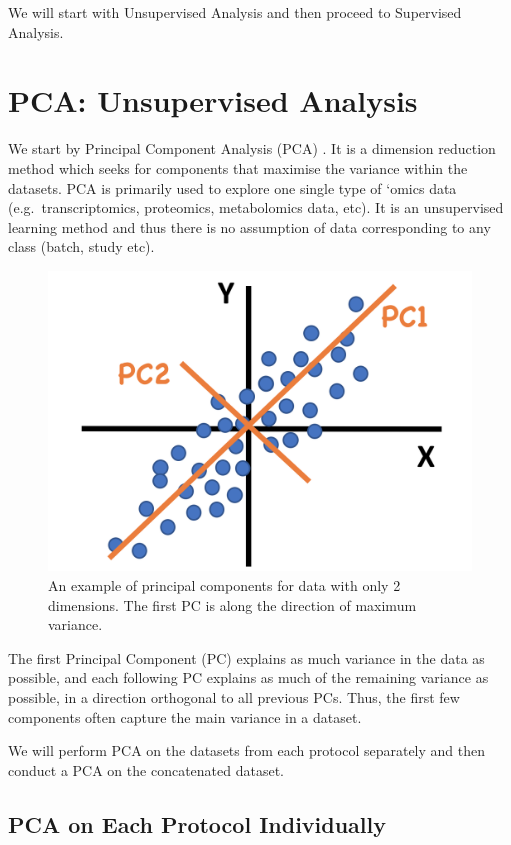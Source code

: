 \documentclass[]{book}
\theoremstyle{definition}
\theoremstyle{definition}
\theoremstyle{definition}
\theoremstyle{remark}
\begin{document}
We will start with Unsupervised Analysis and then proceed to Supervised
Analysis.

\hypertarget{pca-unsupervised-analysis}{%
\section{PCA: Unsupervised Analysis}\label{pca-unsupervised-analysis}}

We start by Principal Component Analysis (PCA) \citep{pca}. It is a
dimension reduction method which seeks for components that maximise the
variance within the datasets. PCA is primarily used to explore one
single type of `omics data (e.g.~transcriptomics, proteomics,
metabolomics data, etc). It is an unsupervised learning method and thus
there is no assumption of data corresponding to any class (batch, study
etc).

\begin{figure}[ht]

{\centering \includegraphics[width=0.4\linewidth]{figures/pca} 

}

\caption{An example of principal components for data with only 2 dimensions. The first PC is along the direction of maximum variance.}\label{fig:1-pcaExample}
\end{figure}

The first Principal Component (PC) explains as much variance in the data
as possible, and each following PC explains as much of the remaining
variance as possible, in a direction orthogonal to all previous PCs.
Thus, the first few components often capture the main variance in a
dataset.

We will perform PCA on the datasets from each protocol separately and
then conduct a PCA on the concatenated dataset.

\hypertarget{pca-on-each-protocol-individually}{%
\subsection{PCA on Each Protocol
Individually}\label{pca-on-each-protocol-individually}}
\end{document}
